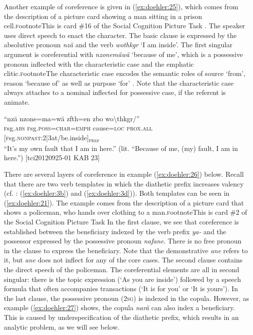 \documentclass[output=paper]{langscibook}
\begin{document}
Another example of coreference is given in (\ref{ex:doehler:25}), which comes from the description of a picture card showing a man sitting in a prison cell.\textsc{f}ootnote{This is card \#16 of the Social Cognition Picture Task \citep{Carroll2009}.} The speaker uses direct speech to enact the character. The basic clause is expressed by the absolutive pronoun \emph{nzä} and the verb \emph{wothkgr} `I am inside'. The first singular argument is coreferential with \emph{nzonemäwä} `because of me', which is a possessive pronoun inflected with the characteristic case and the emphatic clitic.\textsc{f}ootnote{The characteristic case encodes the semantic roles of source `from', reason `because of' as well as purpose `for' \citep[157]{Doehler2018}. Note that the characteristic case always attaches to a nominal inflected for possessive case, if the referent is animate.}


\ea
	\gll ``{nzä} {nzone=ma=wä} {zfth=en} {zbo} {wo\textbackslash{thkgr}/}''\\
	\textsc{f}sg.\textsc{abs}{} \textsc{f}sg.\textsc{poss}=\textsc{char}=\textsc{emph}{} cause=\textsc{loc}{} \textsc{prox}.\textsc{all}{} [\textsc{f}sg.\textsc{nonpast}:2|3at/be.inside]\textsubscript{\textsc{pref}}\\
	\glt ``It's my own fault that I am in here.'' (lit. ``Because of me, (my) fault, I am in here.'') [tci20120925-01 KAB 23] %
	\label{ex:doehler:25}
	\z

There are several layers of coreference in example (\ref{ex:doehler:26}) below. Recall that there are two verb templates in which the diathetic prefix increases valency (cf. : (\ref{ex:doehler:3b}) and (\ref{ex:doehler:3d})). Both templates can be seen in (\ref{ex:doehler:21}). The example comes from the description of a picture card that shows a policeman, who hands over clothing to a man.\textsc{f}ootnote{This is card \#2 of the Social Cognition Picture Task \citep{CarrollEtAl2009}} In the first clause, we see that coreference is established between the beneficiary indexed by the verb prefix \emph{ya-} and the possessor expressed by the possessive pronoun \emph{nafane}. There is no free pronoun in the clause to express the beneficiary. Note that the demonstrative \emph{ane} refers to it, but \emph{ane} does not inflect for any of the core cases. The second clause contains the direct speech of the policeman. The coreferential elements are all in second singular: there is the topic expression (`As you are inside') followed by a speech formula that often accompanies transactions (`It is for you' or `It is yours'). In the last clause, the possessive pronoun (\textsc{2sg}) is indexed in the copula. However, as example (\ref{ex:doehler:27}) shows, the copula \emph{narä} can also index a beneficiary. This is caused by underspecification of the diathetic prefix, which results in an analytic problem, as we will see below.
\end{document}
